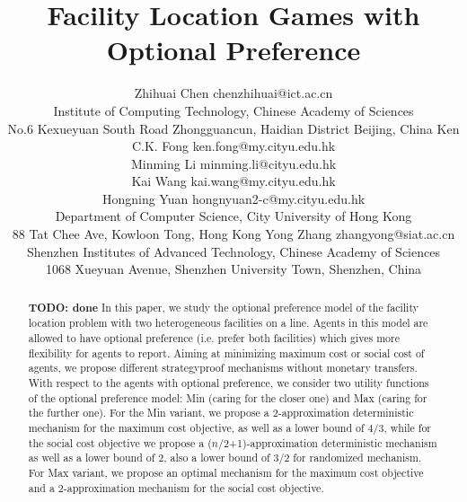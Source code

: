 \documentclass[twoside,11pt]{article}
\newcommand{\todo}[1]{}
\renewcommand{\todo}[1]{{\textbf{\color{red} TODO: {#1}}}}
\begin{document}
\title{Facility Location Games with Optional Preference}


\author{\name Zhihuai Chen \email chenzhihuai@ict.ac.cn \\
\addr Institute of Computing Technology, Chinese Academy of Sciences\\
No.6 Kexueyuan South Road Zhongguancun, Haidian District Beijing, China
%
       \AND
%
\name Ken C.K. Fong \email ken.fong@my.cityu.edu.hk \\
\name Minming Li \email minming.li@cityu.edu.hk \\
\name Kai Wang \email kai.wang@my.cityu.edu.hk \\
\name Hongning Yuan \email hongnyuan2-c@my.cityu.edu.hk \\
\addr Department of Computer Science, City University of Hong Kong\\
88 Tat Chee Ave, Kowloon Tong, Hong Kong
%
       \AND
%
\name Yong Zhang \email zhangyong@siat.ac.cn \\
\addr Shenzhen Institutes of Advanced Technology, Chinese Academy of Sciences\\
1068 Xueyuan Avenue, Shenzhen University Town, Shenzhen, China
       }

\maketitle

\begin{abstract}\todo{done}
In this paper, we study the optional preference model of the facility location problem with two heterogeneous facilities on a line.
Agents in this model are allowed to have optional preference (i.e. prefer both facilities) which gives more flexibility for agents to report.
Aiming at minimizing maximum cost or social cost of agents, we propose different strategyproof mechanisms without monetary transfers.
With respect to the agents with optional preference, we consider two utility functions of the optional preference model: Min (caring for the closer one) and Max (caring for the further one).
For the Min variant, we propose a $2$-approximation deterministic mechanism for the maximum cost objective, as well as a lower bound of $4/3$,
while for the social cost objective we propose a ($n/2$+1)-approximation deterministic mechanism as well as a lower bound of $2$, also a lower bound of $3/2$ for randomized mechanism.
For Max variant, we propose an optimal mechanism for the maximum cost objective and a 2-approximation mechanism for the social cost objective.
\end{abstract}
\end{document}
